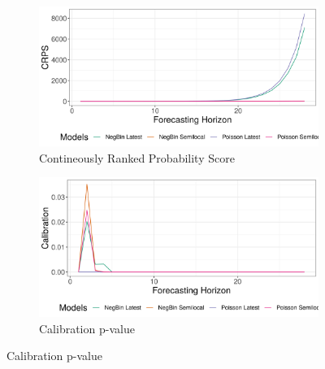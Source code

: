 \begin{figure}[H]
\begin{subfigure}{0.5\textwidth}
  \centering
  \includegraphics[width=\linewidth]{../output/Katwa_crps.png}  
  \caption{Contineously Ranked Probability Score}
  \label{fig:sub-first}
\end{subfigure}
\begin{subfigure}{0.5\textwidth}
  \centering
  \includegraphics[width=\linewidth]{../output/Katwa_calibration.png}  
  \caption{Calibration p-value}
  \label{fig:sub-second}
\end{subfigure}


\end{figure}
